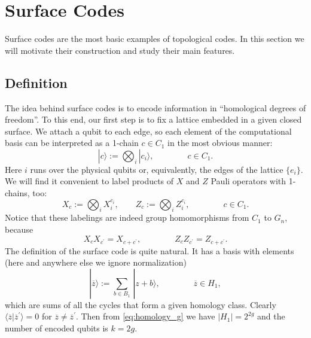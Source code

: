 \documentclass{article}
\newcommand{\sset}[1]{ \{#1\} }
\newcommand{\prima}{^\prime}
\newcommand{\ket}[1]{|#1\rangle}
\newcommand{\braket}[2]{\langle #1|#2 \rangle}
\newcommand{\pauli}[1]{G_{#1}}
\begin{document}
\section{Surface Codes}\label{sec:surface_codes}

Surface codes are the most basic examples of topological codes.  In this section we will motivate their construction and study their main features.

\subsection{Definition}

The idea behind surface codes is to encode information in ``homological degrees of freedom''. To this end, our first step is to fix a lattice embedded in a given closed surface. We attach a qubit to each edge, so each element of the computational basis can be interpreted as a 1-chain $c\in C_1$ in the most obvious manner:
\begin{equation}\label{1chain_basis}
\ket {c}:= \bigotimes_i \ket {c_i},\qquad\qquad c\in C_1.
\end{equation}
Here $i$ runs over the physical qubits or, equivalently, the edges of the lattice $\sset{e_i}$.
We will find it convenient to label products of $X$ and $Z$ Pauli operators with 1-chains, too:
\begin{equation}\label{XZ_ops_1chain}
X_c:= \bigotimes_i X_i^{c_i} ,\qquad Z_c:= \bigotimes_i Z_i^{c_i} ,\qquad\qquad c\in C_1.
\end{equation}
Notice that these labelings are indeed group homomorphisms from $C_1$ to $\pauli n$, because
\begin{equation}\label{XZ_ops_1chain2}
X_cX_{c\prima}=X_{c+c\prima},\qquad\qquad Z_cZ_{c\prima}=Z_{c+c\prima}.
\end{equation}
The definition of the surface code is quite natural. It has a basis with elements (here and anywhere else we ignore normalization)
\begin{equation}\label{surface_code_basis}
\ket {\overline z}:= \sum_{b\in B_1}\,\ket {z+b}, \qquad\qquad \overline z\in H_1,
\end{equation}
which are sums of all the cycles that form a given homology class. Clearly $\braket {\overline z}{\overline z\prima}=0$ for $\overline z\neq \overline z\prima$. Then from \eqref{eq:homology_g} we have $|H_1|=2^{2g}$ and  the number of encoded qubits is $k=2g$.
\end{document}
